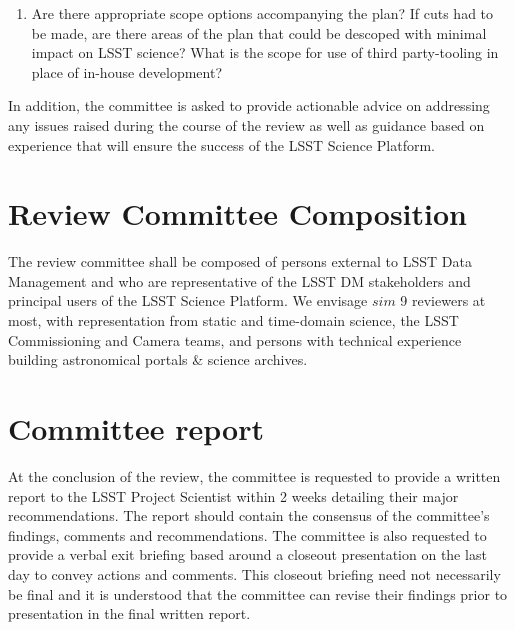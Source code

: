 \documentclass[DM,lsstdraft,STS,toc]{lsstdoc}
\begin{document}
\begin{enumerate}
%
\item Are there appropriate scope options accompanying the plan? 
If cuts had to be made, are there areas of the plan that could be descoped with minimal impact on LSST science?
What is the scope for use of third party-tooling in place of in-house development? 

\end{enumerate}

In addition, the committee is asked to provide actionable advice on addressing any issues raised during the course of the review as well as guidance based on experience that will ensure the success of the LSST Science Platform.

\section{Review Committee Composition}
The review committee shall be composed of persons external to LSST Data Management
and who are representative of the LSST DM stakeholders and principal users of the LSST Science Platform. 
We envisage $sim$ 9 reviewers at most, with representation from static and time-domain science, the LSST Commissioning and Camera teams,  
and persons with technical experience building astronomical portals \& science archives. 


\section{Committee report}
At the conclusion of the review, the committee is requested to provide a written report  to the LSST Project Scientist within 2 weeks  detailing
their major recommendations.  The report should contain the consensus of the committee's findings, comments and recommendations. The committee is also requested to
provide a verbal exit briefing based around a closeout presentation on the last day to convey actions and comments. This closeout briefing need not
necessarily be final and it is understood that the committee can revise their findings prior to presentation in the final written report.
\end{document}
